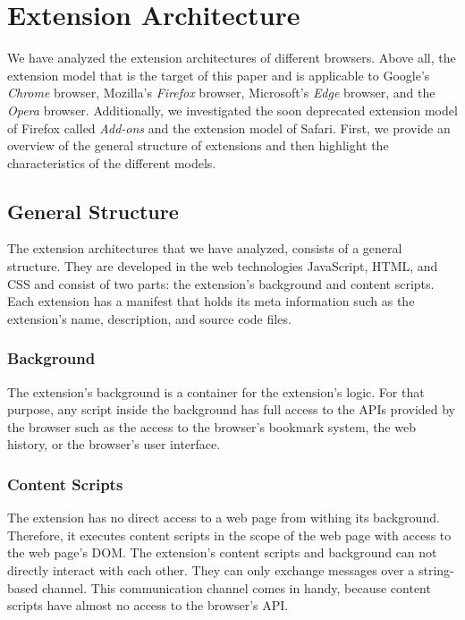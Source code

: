 \newpage
\section{Extension Architecture}
	
	We have analyzed the extension architectures of different browsers. Above all, the extension model that is the target of this paper and is applicable to Google's \textit{Chrome} browser, Mozilla's \textit{Firefox} browser, Microsoft's \textit{Edge} browser, and the \textit{Opera} browser. Additionally, we investigated the soon deprecated extension model of Firefox called \textit{Add-ons} and the extension model of Safari. First, we provide an overview of the general structure of extensions and then highlight the characteristics of the different models.
	
\subsection{General Structure} %

	The extension architectures that we have analyzed, consists of a general structure. They are developed in the web technologies JavaScript, HTML, and CSS and consist of two parts: the extension's background and content scripts. Each extension has a manifest that holds its meta information such as the extension's name, description, and source code files.
	
\subsubsection{Background}

	The extension's background is a container for the extension's logic. For that purpose, any script inside the background has full access to the APIs provided by the browser such as the access to the browser's bookmark system, the web history, or the browser's user interface. 
	
\subsubsection{Content Scripts}

	The extension has no direct access to a web page from withing its background. Therefore, it executes content scripts in the scope of the web page with access to the web page's DOM. The extension's content scripts and background can not directly interact with each other. They can only exchange messages over a string-based channel. This communication channel comes in handy, because content scripts have almost no access to the browser's API. 
	
